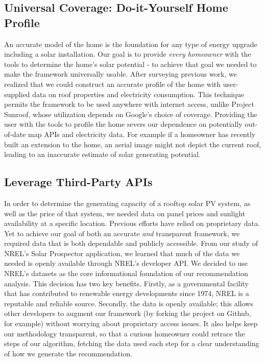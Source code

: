 \documentclass[pageno]{jpaper}
\begin{document}
\subsection{Universal Coverage: Do-it-Yourself Home Profile}
An accurate model of the home is the foundation for any type of energy upgrade including a solar installation. Our goal is to provide {\em every homeowner} with the tools to determine the home's solar potential - to achieve that goal we needed to make the framework universally usable. After surveying previous work, we realized that we could construct an accurate profile of the home with user-supplied data on roof properties and electricity consumption. This technique permits the framework to be used anywhere with internet access, unlike Project Sunroof, whose utilization depends on Google's choice of coverage. Providing the user with the tools to profile the home severs our dependence on potentially out-of-date map APIs and electricity data. For example if a homeowner has recently built an extension to the home, an aerial image might not depict the current roof, leading to an inaccurate estimate of solar generating potential.

\subsection{Leverage Third-Party APIs}
In order to determine the generating capacity of a rooftop solar PV system, as well as the price of that system, we needed data on panel prices and sunlight availability at a specific location. Previous efforts have relied on proprietary data. Yet to achieve our goal of both an accurate {\em and} transparent framework, we required data that is both dependable and publicly accessible. From our study of NREL's Solar Prospector application, we learned that much of the data we needed is openly available through NREL's developer API. We decided to use NREL's datasets as the core informational foundation of our recommendation analysis. This decision has two key benefits. Firstly, as a governmental facility that has contributed to renewable energy developments since 1974, NREL is a reputable and reliable source. Secondly, the data is openly available; this allows other developers to augment our framework (by forking the project on Github, for example) without worrying about proprietary access issues. It also helps keep our methodology transparent, so that a curious homeowner could retrace the steps of our algorithm, fetching the data used each step for a clear understanding of how we generate the recommendation. 
\end{document}
